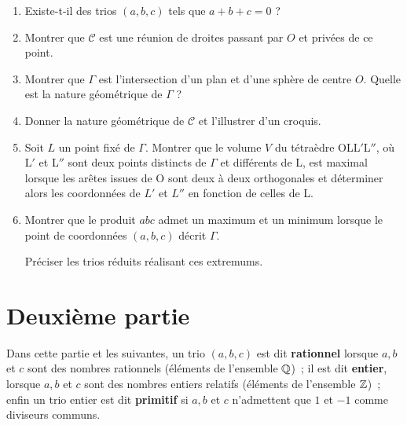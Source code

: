 \begin{enumerate}
\item Existe-t-il des trios $(a, b, c)$ tels que $a + b + c = 0$ ?
\item Montrer que $\mathcal{C}$ est une réunion de droites passant par $O$
et privées de ce point.
\item Montrer que $\Gamma$ est l'intersection d'un plan et d'une sphère de
centre $O$.  Quelle est la nature géométrique de $\Gamma$ ?
\item Donner la nature géométrique de $\mathcal{C}$ et l'illustrer d'un
croquis.
\item Soit $ L$ un point fixé de $\Gamma$.
Montrer que le volume $V$ du tétraèdre OLL$'$L$''$, où L$'$ et L$''$ sont
deux points distincts de $\Gamma$ et différents de L, est maximal lorsque
les arêtes issues de O sont deux à deux orthogonales et déterminer alors
les coordonnées de $L'$ et $L''$ en fonction de celles de L.
\item Montrer que le produit $abc$ admet un maximum et un minimum lorsque
le point de coordonnées $(a, b, c)$ décrit $\Gamma$.

Préciser les trios réduits réalisant ces extremums.
\end{enumerate}

\newpage

\section*{\color{blue}Deuxième partie}


Dans cette partie et les suivantes, un trio $(a, b, c)$ est dit
\textbf{rationnel} lorsque $a, b$ et $c$ sont des nombres rationnels
(éléments de l'ensemble $\mathbb{Q}$)~; il est dit \textbf{entier}, lorsque $a, b$
et $c$ sont des nombres entiers relatifs (éléments de l'ensemble $\mathbb{Z}$)~;
enfin un trio entier est dit \textbf{primitif} si $a, b$ et $c$ n'admettent
que $1$ et $- 1$ comme diviseurs communs.

\medskip

